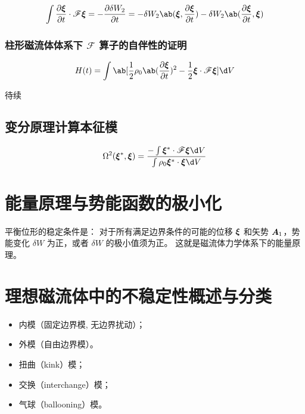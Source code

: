 \begin{equation}
\int \pDeriv{\vector{\xi}}{t} \cdot \mathscr{F} \vector{\xi}
= - \pDeriv{\delta W_2}{t}
= - \delta W_2\ab(\vector{\xi}, \pDeriv{\vector{\xi}}{t})
- \delta W_2\ab(\pDeriv{\vector{\xi}}{t}, \vector{\xi})
\end{equation}

\subsubsection{柱形磁流体体系下 \texorpdfstring{$\mathscr{F}$}{F} 算子的自伴性的证明}

\begin{equation}
H(t) = \int \ab[
    \frac12 \rho_0 \ab(\pDeriv{\vector{\xi}}{t})^2
    - \frac12 \vector{\xi} \cdot \mathscr{F} \vector{\xi}
] \d V
\end{equation}

待续

\subsection{变分原理计算本征模}

\begin{equation}
\Omega^2(\vector{\xi}^*, \vector{\xi})
= \dfrac{
    - \int \vector{\xi}^* \cdot \mathscr{F} \vector{\xi} \d V
}{
    \int \rho_0 \vector{\xi}^* \cdot \vector{\xi} \d V
}
\end{equation}

\section{能量原理与势能函数的极小化}

平衡位形的稳定条件是：
对于所有满足边界条件的可能的位移 $\bm{\xi}$ 和矢势 $\bm{A}_1$，势能变化 $\delta W$ 为正，或者 $\delta W$ 的极小值须为正。
这就是磁流体力学体系下的能量原理。

\section{理想磁流体中的不稳定性概述与分类}

\begin{itemize}
    \item 内模（固定边界模, 无边界扰动）；
    \item 外模（自由边界模）。
\end{itemize}

\begin{itemize}
    \item 扭曲（kink）模；
    \item 交换（interchange）模；
    \item 气球（ballooning）模。
\end{itemize}

